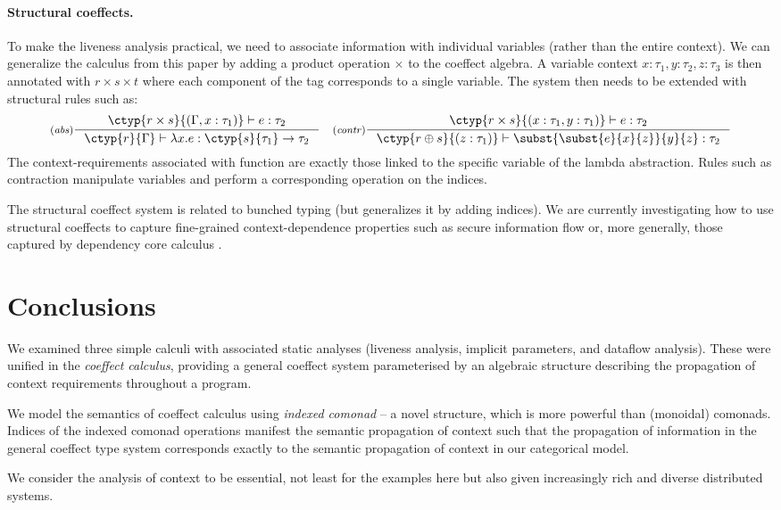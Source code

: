 \newcommand{\cprd}{\times}
\newcommand{\cvop}{\oplus}

\vspace{-1em}
\paragraph{Structural coeffects.} To make the liveness analysis practical, we need to associate
information with individual variables (rather than the entire context). We can generalize the 
calculus from this paper by adding a product operation $\times$ to the coeffect algebra.
A variable context $x:\tau_1, y:\tau_2, z:\tau_3$ is then annotated with
$r\times s \times t$ where each component of the tag corresponds to a single variable. The system
then needs to be extended with structural rules such as:
%
\begin{equation*}
\inference[(\emph{abs})]
  {\ctyp{r \cprd s}{(\Gamma, x:\tau_1)} \vdash e : \tau_2}
  {\ctyp{r}{\Gamma} \vdash \lambda x.e : \ctyp{s}{\tau_1} \rightarrow \tau_2 }
\quad
\inference[(\emph{contr})]
  {\ctyp{r \cprd s}{(x:\tau_1, y:\tau_1)} \vdash e : \tau_2}
  {\ctyp{r \cvop s }{(z:\tau_1)} \vdash \subst{\subst{e}{x}{z}}{y}{z} : \tau_2 }
\end{equation*}
%
The context-requirements associated with function are exactly those linked to the specific
variable of the lambda abstraction. Rules such as contraction manipulate variables and perform
a corresponding operation on the indices.

The structural coeffect system is related to bunched typing \cite{types-bunched} (but generalizes
it by adding indices). We are currently investigating how to use structural coeffects to capture 
fine-grained context-dependence properties such as secure information flow \cite{app-secure-flow}
or, more generally, those captured by dependency core calculus \cite{types-dcc}.


\section{Conclusions}

We examined three simple calculi with associated
static analyses (liveness analysis, implicit parameters, and dataflow
analysis). These were unified in the \emph{coeffect calculus},
providing a general coeffect system parameterised by an
algebraic structure describing the propagation of context
requirements throughout a program.

We model the semantics of coeffect calculus using \emph{indexed comonad} -- a novel structure, which
is more powerful than (monoidal) comonads. Indices of the indexed comonad operations manifest the 
semantic propagation of context such that the propagation of information in the general coeffect
type system corresponds exactly to the semantic propagation of context in our categorical model.

We consider the analysis of context to be essential, not least for the examples here but 
also given increasingly rich and diverse distributed systems.
